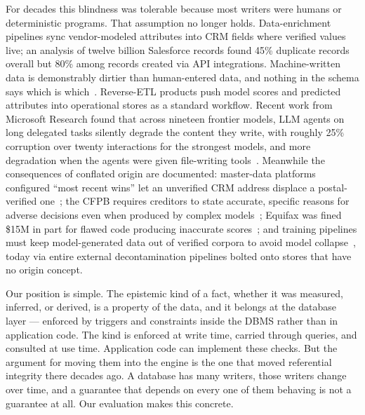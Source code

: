 \documentclass[sigconf,nonacm]{acmart}
\begin{document}
For decades this blindness was tolerable because most writers were humans or deterministic programs. That assumption no longer holds. Data-enrichment pipelines sync vendor-modeled attributes into CRM fields where verified values live; an analysis of twelve billion Salesforce records found 45\% duplicate records overall but 80\% among records created via API integrations. Machine-written data is demonstrably dirtier than human-entered data, and nothing in the schema says which is which~\cite{revblack}. Reverse-ETL products push model scores and predicted attributes into operational stores as a standard workflow. Recent work from Microsoft Research found that across nineteen frontier models, LLM agents on long delegated tasks silently degrade the content they write, with roughly 25\% corruption over twenty interactions for the strongest models, and more degradation when the agents were given file-writing tools~\cite{corrupt}. Meanwhile the consequences of conflated origin are documented: master-data platforms configured ``most recent wins'' let an unverified CRM address displace a postal-verified one~\cite{mdm}; the CFPB requires creditors to state accurate, specific reasons for adverse decisions even when produced by complex models~\cite{cfpb2023}; Equifax was fined \$15M in part for flawed code producing inaccurate scores~\cite{equifax}; and training pipelines must keep model-generated data out of verified corpora to avoid model collapse~\cite{collapse}, today via entire external decontamination pipelines bolted onto stores that have no origin concept.

Our position is simple. The epistemic kind of a fact, whether it was measured, inferred, or derived, is a property of the data, and it belongs at the database layer --- enforced by triggers and constraints inside the DBMS rather than in application code. The kind is enforced at write time, carried through queries, and consulted at use time. Application code can implement these checks. But the argument for moving them into the engine is the one that moved referential integrity there decades ago. A database has many writers, those writers change over time, and a guarantee that depends on every one of them behaving is not a guarantee at all. Our evaluation makes this concrete.
\end{document}
